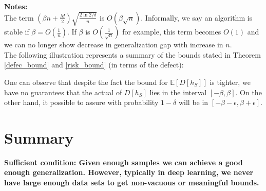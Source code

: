\documentclass{article}
\begin{document}
\textbf{Notes:}\\
The term $(\beta n + \frac{M}{2})\sqrt{\frac{2\ln{2/\delta}}{n}}$ is $O(\beta\sqrt{n})$. Informally, we say an algorithm is stable if $\beta=O(\frac{1}{n})$. If $\beta$ is $O(\frac{1}{\sqrt{n}})$ for example, this term becomes $O(1)$ and we can no longer show decrease in generalization gap with increase in $n$.\\


The following illustration represents a summary of the bounds stated in Theorem \ref{defec_bound} and \ref{risk_bound} (in terms of the defect):
\begin{figure}[H]\centering
\end{figure}
One can observe that despite the fact the bound for $\mathbb{E}[D[h_S]]$ is tighter, we have no guarantees that the actual of $D[h_S]$ lies in the interval $\left[-\beta, \beta \right]$. On the other hand, it possible to assure with probability $1-\delta$ will be in $\left[-\beta-\epsilon, \beta+\epsilon \right]$.

\section*{Summary}
\textbf{Sufficient condition: Given enough samples we can achieve a good enough generalization.  However, typically in deep learning, we never have large enough data sets to get non-vacuous or meaningful bounds.}
\end{document}
